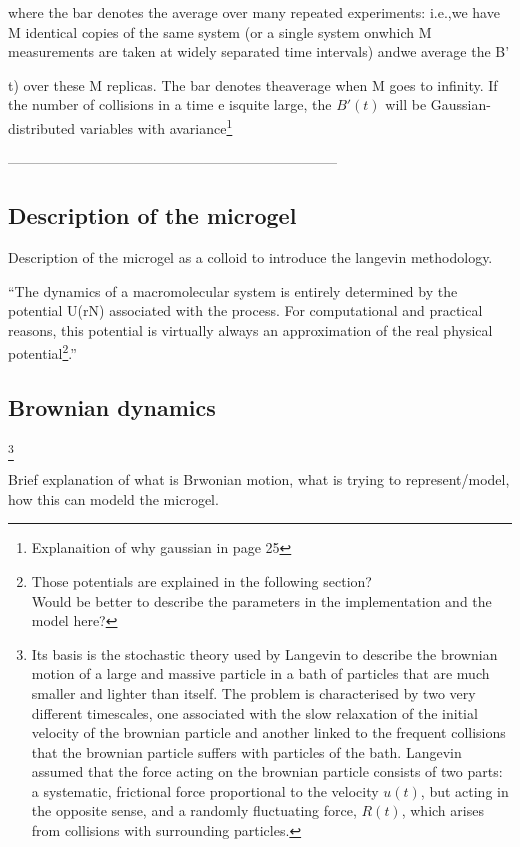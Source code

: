 \documentclass[../../main-notes.tex]{subfiles}
\begin{document}
where the bar denotes the average over many repeated experiments: i.e.,we have M identical copies of the same system (or a single system onwhich M measurements are taken at widely separated time intervals) andwe average the B'{t) over these M replicas. The bar denotes theaverage when M goes to infinity. If the number of collisions in a time e isquite large, the $B'(t)$ will be Gaussian-distributed variables with avariance\footnote{Explanaition of why gaussian in page 25}
~\citep{Parisi1988}


-----------------------------------------------------------------------


\subsection{Description of the microgel}
Description of the microgel as a colloid to introduce the langevin methodology.

“The dynamics of a macromolecular system is entirely determined by the potential U(rN) associated with the process. For computational and practical reasons, this potential is virtually always an approximation of the real physical potential\footnote{Those potentials are explained in the following section?\\ Would be better to describe the parameters in the implementation and the model here?}.”\citep{paquetMolecularDynamicsMonte2015}




\subsection{Brownian dynamics}\footnote{Its basis is the stochastic theory used by Langevin to describe the brownian motion of a large and massive particle in a bath of particles that are much smaller and lighter than itself. 
The problem is characterised by two very different timescales, one associated with the slow relaxation of the initial velocity of the brownian particle and another linked to the frequent collisions that the brownian particle suffers with particles of the bath. 
Langevin assumed that the force acting on the brownian particle consists of two parts: a systematic, frictional force proportional to the velocity $u(t)$, but acting in the opposite sense, and a randomly fluctuating force, $R(t)$, which arises from collisions with surrounding particles\citep{tsl2006}.
}

Brief explanation of what is Brwonian motion, what is trying to represent/model, how this can modeld the microgel.

}
\end{document}
